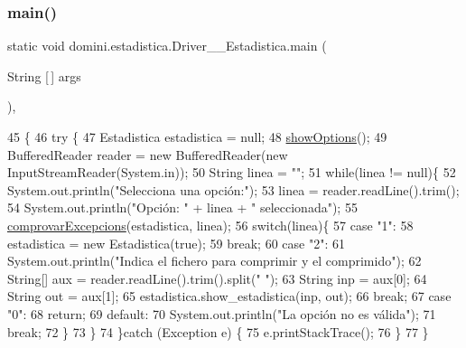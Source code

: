 \subsubsection{\texorpdfstring{main()}{main()}}
{\footnotesize\ttfamily static void domini.\+estadistica.\+Driver\+\_\+\+\_\+\+Estadistica.\+main (\begin{DoxyParamCaption}\item[{String \mbox{[}$\,$\mbox{]}}]{args }\end{DoxyParamCaption})\hspace{0.3cm}{\ttfamily [inline]}, {\ttfamily [static]}}


\begin{DoxyCode}
45                                            \{
46     \textcolor{keywordflow}{try} \{
47         Estadistica estadistica = null;
48         \hyperlink{classdomini_1_1estadistica_1_1Driver____Estadistica_ab42f06b8996094e10bd087ccf2f749e7}{showOptions}();
49         BufferedReader reader = \textcolor{keyword}{new} BufferedReader(\textcolor{keyword}{new} InputStreamReader(System.in));
50         String linea = \textcolor{stringliteral}{""};
51         \textcolor{keywordflow}{while}(linea != null)\{
52             System.out.println(\textcolor{stringliteral}{"Selecciona una opción:"});
53             linea = reader.readLine().trim();
54             System.out.println(\textcolor{stringliteral}{"Opción: "} + linea + \textcolor{stringliteral}{" seleccionada"});
55             \hyperlink{classdomini_1_1estadistica_1_1Driver____Estadistica_a3459f11af9841b23ac81a409a3e84e22}{comprovarExcepcions}(estadistica, linea);
56             \textcolor{keywordflow}{switch}(linea)\{
57                 \textcolor{keywordflow}{case} \textcolor{stringliteral}{"1"}:
58                     estadistica = \textcolor{keyword}{new} Estadistica(\textcolor{keyword}{true});
59                 \textcolor{keywordflow}{break};
60                 \textcolor{keywordflow}{case} \textcolor{stringliteral}{"2"}:
61                     System.out.println(\textcolor{stringliteral}{"Indica el fichero para comprimir y el comprimido"});
62                     String[] aux = reader.readLine().trim().split(\textcolor{stringliteral}{" "});
63                     String inp = aux[0];
64                     String out = aux[1];
65                     estadistica.show\_estadistica(inp, out);
66                 \textcolor{keywordflow}{break};
67                 \textcolor{keywordflow}{case} \textcolor{stringliteral}{"0"}:
68                     \textcolor{keywordflow}{return};
69                 \textcolor{keywordflow}{default}:
70                     System.out.println(\textcolor{stringliteral}{"La opción no es válida"});
71                 \textcolor{keywordflow}{break};
72             \}
73         \}
74     \}\textcolor{keywordflow}{catch} (Exception e) \{
75         e.printStackTrace();
76     \}
77     \}
\end{DoxyCode}
